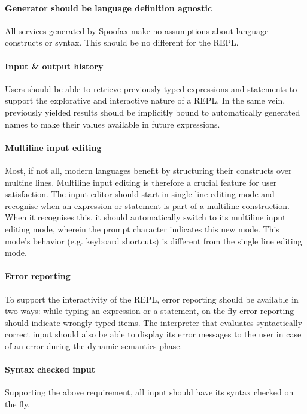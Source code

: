 \paragraph{Generator should be language definition agnostic} All services
generated by Spoofax make no assumptions about language constructs or syntax.
This should be no different for the REPL.

\paragraph{Input \& output history} Users should be able to retrieve previously
typed expressions and statements to support the explorative and interactive
nature of a REPL. In the same vein, previously yielded results should be
implicitly bound to automatically generated names to make their values available
in future expressions.

\paragraph{Multiline input editing} Most, if not all, modern languages benefit
by structuring their constructs over multine lines. Multiline input editing is
therefore a crucial feature for user satisfaction. The input editor should
start in single line editing mode and recognise when an expression or statement
is part of a multiline construction. When it recognises this, it should
automatically switch to its multiline input editing mode, wherein the
prompt character indicates this new mode. This mode's behavior (e.g. keyboard
shortcuts) is different from the single line editing mode.

\paragraph{Error reporting} To support the interactivity of the REPL, error
reporting should be available in two ways: while typing an expression or a
statement, on-the-fly error reporting should indicate wrongly typed items. The
interpreter that evaluates syntactically correct input should also be able to
display its error messages to the user in case of an error during the dynamic
semantics phase.

\paragraph{Syntax checked input} Supporting the above requirement, all
input should have its syntax checked on the fly.

